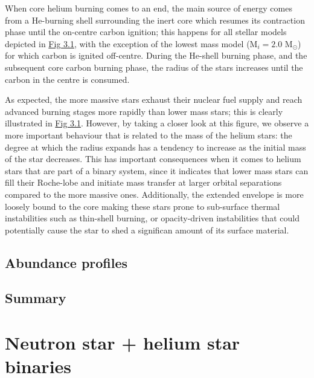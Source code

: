 \documentclass[../../main/thesis_msc.tex]{subfiles}
\begin{document}
					When core helium burning comes to an end, the main source of energy comes from a He-burning shell surrounding the inert core which resumes its contraction phase until the on-centre carbon ignition; this happens for all stellar models depicted in \hyperref[fig:radii_singles]{Fig 3.1}, with the exception of the lowest mass model (M$_{i} = 2.0$ M$_{\odot}$) for which carbon is ignited off-centre. During the He-shell burning phase, and the subsequent core carbon burning phase, the radius of the stars increases until the carbon in the centre is consumed.
					
					As expected, the more massive stars exhaust their nuclear fuel supply and reach advanced burning stages more rapidly than lower mass stars; this is clearly illustrated in \hyperref[fig:radii_singles]{Fig 3.1}. However, by taking a closer look at this figure, we observe a more important behaviour that is related to the mass of the helium stars: the degree at which the radius expands has a tendency to increase as the initial mass of the star decreases. This has important consequences when it comes to helium stars that are part of a binary system, since it indicates that lower mass stars can fill their Roche-lobe and initiate mass transfer at larger orbital separations compared to the more massive ones. Additionally, the extended envelope is more loosely bound to the core making these stars prone to sub-surface thermal instabilities such as thin-shell burning, or opacity-driven instabilities that could potentially cause the star to shed a significan amount of its surface material. %
				
				
				\subsection{Abundance profiles}	
				
				
				\subsection{Summary}
			
			
			
			\section{Neutron star + helium star binaries}
\end{document}
